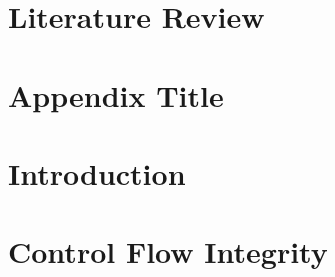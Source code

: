 \documentclass[10pt]{report}
\newif\iflitreview
\newif\ifnotesincluded
\begin{document}


\iflitreview

\else

\fi
\ifnotesincluded
\chapter*{Abstract}
This is my abstract

\chapter*{Dedication}
This is my dedication

\chapter*{Declaration}
This is my declaration

\chapter*{Acknowledgements}
Thanks everyone!

\fi

\tableofcontents
\lstlistoflistings
\listoffigures
\listoftables



\iflitreview

\chapter{Literature Review}


\appendix
\chapter{Appendix Title}

\else

\chapter{Introduction}







\chapter{Control Flow Integrity} \label{chapterCFI}

\end{document}
